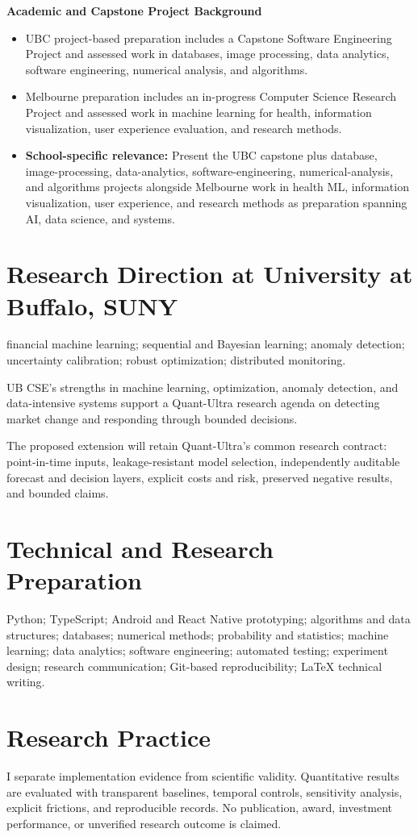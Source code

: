 \documentclass[11pt]{article}
\begin{document}
\textbf{Academic and Capstone Project Background}
\begin{itemize}
\item UBC project-based preparation includes a Capstone Software Engineering Project and assessed work in databases, image processing, data analytics, software engineering, numerical analysis, and algorithms.
\item Melbourne preparation includes an in-progress Computer Science Research Project and assessed work in machine learning for health, information visualization, user experience evaluation, and research methods.
\item \textbf{School-specific relevance:} Present the UBC capstone plus database, image-processing, data-analytics, software-engineering, numerical-analysis, and algorithms projects alongside Melbourne work in health ML, information visualization, user experience, and research methods as preparation spanning AI, data science, and systems.
\end{itemize}

\section*{Research Direction at University at Buffalo, SUNY}
financial machine learning; sequential and Bayesian learning; anomaly detection; uncertainty calibration; robust optimization; distributed monitoring.

UB CSE's strengths in machine learning, optimization, anomaly detection, and data-intensive systems support a Quant-Ultra research agenda on detecting market change and responding through bounded decisions.

The proposed extension will retain Quant-Ultra's common research contract: point-in-time inputs, leakage-resistant model selection, independently auditable forecast and decision layers, explicit costs and risk, preserved negative results, and bounded claims.

\section*{Technical and Research Preparation}
Python; TypeScript; Android and React Native prototyping; algorithms and data structures; databases; numerical methods; probability and statistics; machine learning; data analytics; software engineering; automated testing; experiment design; research communication; Git-based reproducibility; LaTeX technical writing.

\section*{Research Practice}
I separate implementation evidence from scientific validity. Quantitative results are evaluated with transparent baselines, temporal controls, sensitivity analysis, explicit frictions, and reproducible records. No publication, award, investment performance, or unverified research outcome is claimed.
\end{document}
